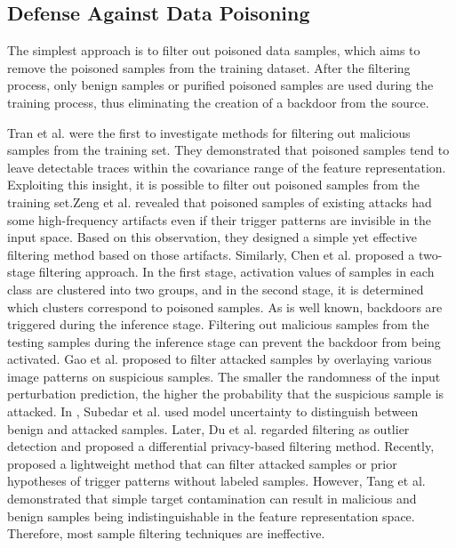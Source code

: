 \documentclass[conference]{IEEEtran}
\begin{document}
\subsection{Defense Against Data Poisoning}
The simplest approach is to filter out poisoned data samples, 
which aims to remove the poisoned samples from the training dataset. 
After the filtering process, only benign samples or purified poisoned 
samples are used during the training process, thus eliminating the 
creation of a backdoor from the source.  

Tran et al.\cite{b67} were the first to investigate methods for filtering out malicious 
samples from the training set. They demonstrated that poisoned samples tend to 
leave detectable traces within the covariance range of the feature representation. 
Exploiting this insight, it is possible to filter out poisoned samples from 
the training set.Zeng et al. \cite{b68} revealed that poisoned samples of 
existing attacks had some high-frequency artifacts even if their trigger 
patterns are invisible in the input space. Based on this observation, 
they designed a simple yet effective filtering method based on those artifacts.
Similarly, Chen et al. \cite{b69}proposed a two-stage filtering approach. 
In the first stage, activation values of samples in each class are clustered 
into two groups, and in the second stage, it is determined which clusters 
correspond to poisoned samples. 
As is well known, backdoors are triggered during the inference stage. 
Filtering out malicious samples from the testing samples during the inference stage can prevent the backdoor 
from being activated. Gao et al. \cite{b71} proposed to filter attacked samples by overlaying various image patterns 
on suspicious samples. The smaller the randomness of the input perturbation prediction, the higher the probability 
that the suspicious sample is attacked. In \cite{b72}, Subedar et al. used model uncertainty to distinguish between 
benign and attacked samples. Later, Du et al. \cite{b73} regarded filtering as outlier detection and proposed a 
differential privacy-based filtering method. Recently, \cite{b74} proposed a lightweight method that can filter 
attacked samples or prior hypotheses of trigger patterns without labeled samples.
However, Tang et al.\cite{b70} demonstrated that
simple target contamination can result in malicious and benign samples being 
indistinguishable in the feature representation space. Therefore, most 
sample filtering techniques are ineffective.
\end{document}
